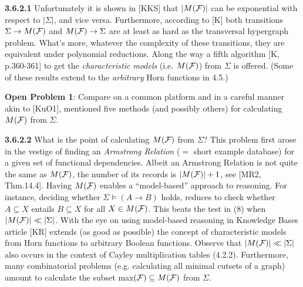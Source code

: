 \documentclass[11pt]{article}
\newcommand{\ra}{\rightarrow}
\begin{document}
{\bf 3.6.2.1} Unfortunately it is shown in [KKS] that $|M({\cal F})|$ can be exponential with respect to $|\Sigma|$, and vice versa. Furthermore, according to [K] both transitions $\Sigma \ra M({\cal F})$ and $M({\cal F}) \ra \Sigma$ are at least as hard as the transversal hypergraph problem. What's more, whatever the complexity of these transitions, they are equivalent under polynomial reductions. 
Along the way a fifth algorithm [K, p.360-361] to get the {\it characteristic models} (i.e. $M({\cal F})$) from $\Sigma$ is offered. (Some of these results extend to the {\it arbitrary} Horn functions in  4.5.)

{\bf Open Problem 1}: Compare on a common platform and in a careful manner akin to [KuO1], mentioned five methods (and possibly others) for calculating $M({\cal F})$ from $\Sigma$.


{\bf 3.6.2.2} What is the point of calculating $M({\cal F})$ from $\Sigma$? This problem first arose in the vestige of finding an {\it Armstrong Relation} ($=$ short example database) for a given set of functional dependencies. Albeit an Armstrong Relation is not quite the same as $M({\cal F})$, the number of its records is $|M({\cal F})| +1$, see [MR2, Thm.14.4]. Having $M({\cal F})$ enables a ``model-based'' approach to reasoning. For instance, deciding whether $\Sigma \vDash (A \ra B)$ holds, reduces to check whether $A \subseteq X$ entails $B \subseteq X$ for all $X \in M({\cal F})$. This beats the test in (8) when $|M({\cal F})| \ll |\Sigma|$. With the eye on using model-based reasoning in Knowledge Bases article [KR] extends (as good as possible) the concept of characteristic models from Horn functions to arbitrary Boolean functions. Observe that $|M({\cal F})| \ll |\Sigma|$ also occurs in the context of Cayley multiplication tables (4.2.2). Furthermore, many combinatorial problems (e.g. calculating all minimal cutsets of a graph) amount to calculate the subset max$({\cal F}) \subseteq M({\cal F})$ from $\Sigma$.
\end{document}
